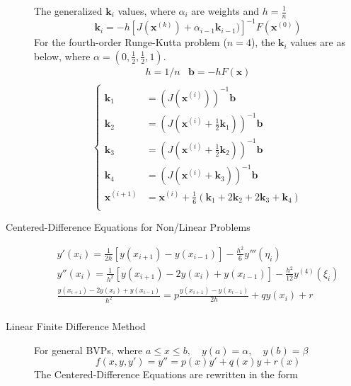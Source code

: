 \documentclass[8pt]{article}
\begin{document}
\begin{multicols}{2}
\begin{description}
    The generalized $\mathbf{k}_i$ values, where $\alpha_i$ are weights and $h=\frac{1}{n}$
    $$ \mathbf{k}_i = -h[J(\mathbf{x}^{(k)})+\alpha_{i-1}\mathbf{k}_{i-1})]^{-1}F(\mathbf{x}^{(0)}) $$
    For the fourth-order Runge-Kutta problem ($n=4$), the $\mathbf{k}_i$ values are as below,
    where $\alpha = (0, \frac{1}{2}, \frac{1}{2}, 1)$.
    \begin{equation*}
      \begin{aligned}
        &h = 1/n & \mathbf{b} =-hF(\mathbf{x})& \\
      \end{aligned}
    \end{equation*}
    \begin{equation*}
      \left\{
        \begin{aligned}
          \mathbf{k}_1 &= (J(\mathbf{x}^{(i)}))^{-1}\mathbf{b} \\
          \mathbf{k}_2 &= (J(\mathbf{x}^{(i)}+\frac{1}{2}\mathbf{k}_1))^{-1}\mathbf{b} \\
          \mathbf{k}_3 &= (J(\mathbf{x}^{(i)}+\frac{1}{2}\mathbf{k}_2))^{-1}\mathbf{b} \\
          \mathbf{k}_4 &= (J(\mathbf{x}^{(i)}+\mathbf{k}_3))^{-1}\mathbf{b} \\
          \mathbf{x}^{(i+1)} &= \mathbf{x}^{(i)} + \frac{1}{6}(\mathbf{k}_1+2\mathbf{k}_2+2\mathbf{k}_3+\mathbf{k}_4) \\
        \end{aligned}
      \right.
    \end{equation*}
  \item[Centered-Difference Equations for Non/Linear Problems]
    \begin{gather*}
      y'(x_i)=\frac{1}{2h}[y(x_{i+1})-y(x_{i-1})]-\frac{h^2}{6}y'''(\eta_i) \\
      y''(x_i)=\frac{1}{h^2}[y(x_{i+1})-2y(x_i)+y(x_{i-1})]-\frac{h^2}{12}y^{(4)}(\xi_i) \\
      \frac{y(x_{i+1})-2y(x_i)+y(x_{i-1})}{h^2} = p\frac{y(x_{i+1}) - y(x_{i-1})}{2h}+qy(x_i) + r \\
    \end{gather*}
  \item[Linear Finite Difference Method]
    For general BVPs, where \linebreak[4]
    $a\leq x \leq b,\quad y(a) = \alpha,\quad y(b) = \beta$
    $$f(x,y,y') = y'' = p(x)y' + q(x)y + r(x)$$
    The Centered-Difference Equations are rewritten in the form
    \begin{equation*}

\end{equation*}
\end{description}
\end{multicols}
\end{document}
